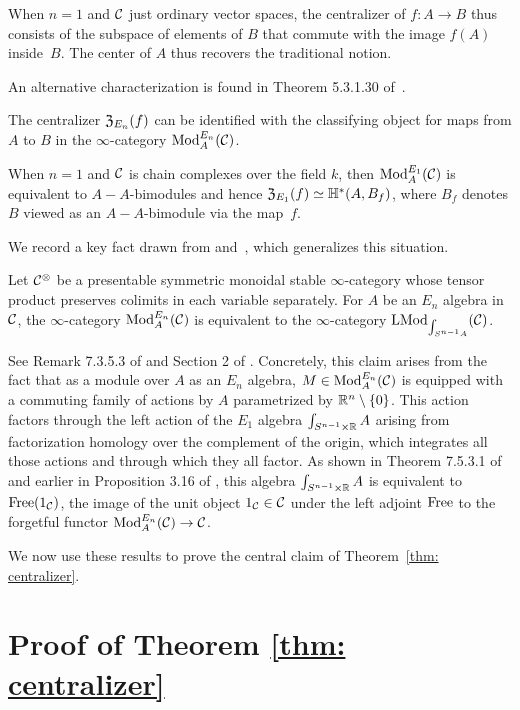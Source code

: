 \documentclass[11pt]{amsart}
\numberwithin{equation}{section}
\begin{document}
When $n=1$ and $\mathcal C$ just ordinary vector spaces, the centralizer of $f: A \to B$ thus consists of the subspace of elements of $B$ that commute with the image $f(A)$ inside~$B$.
The center of $A$ thus recovers the traditional notion.

An alternative characterization is found in Theorem 5.3.1.30 of~\cite{LurieHA}.

\begin{prp}
The centralizer ${\frak Z}_{E_n}(f)$ can be identified with the classifying object for maps from $A$ to $B$ in the $\infty$-category ${\rm Mod}^{E_n}_A(\mathcal C)$.
\end{prp}

When $n=1$ and $\mathcal C$ is chain complexes over the field $k$, 
then ${\rm Mod}^{E_1}_A(\mathcal C)$ is equivalent to $A-A$-bimodules and hence ${\frak Z}_{E_1}(f) \simeq \mathbb H^*(A,B_f)$,
where $B_f$ denotes $B$ viewed as an $A-A$-bimodule via the map~$f$.

We record a key fact drawn from \cite{LurieHA} and~\cite{FrancisHH}, which generalizes this situation.

\begin{prp}
Let $\mathcal C^\otimes$ be a presentable symmetric monoidal stable $\infty$-category whose tensor product preserves colimits in each variable separately.
For $A$ be an $E_n$ algebra in $\mathcal C$,
the $\infty$-category ${\rm Mod}^{E_n}_A(\mathcal C)$ is equivalent to the $\infty$-category ${\rm LMod}_{\int_{S^{n-1} A}}(\mathcal C)$.
\end{prp}

See Remark 7.3.5.3 of \cite{LurieHA} and Section 2 of \cite{FrancisHH}.
Concretely, this claim arises from the fact that as a module over $A$ as an $E_n$ algebra, 
$M \in {\rm Mod}^{E_n}_A(\mathcal C)$ is equipped with a commuting family of actions by $A$ parametrized by $\mathbb R^n \setminus \{0\}$.
This action factors through the left action of the $E_1$ algebra $\int_{S^{n-1} \times \mathbb R} A$ arising from factorization homology over the complement of the origin,
which integrates all those actions and through which they all factor.
As shown in Theorem 7.5.3.1 of \cite{LurieHA} and earlier in Proposition 3.16 of \cite{FrancisHH}, 
this algebra $\int_{S^{n-1} \times \mathbb R} A$ is equivalent to ${\rm Free}(1_\mathcal C)$, 
the image of the unit object $1_\mathcal C \in \mathcal C$ under the left adjoint ${\rm Free}$ to the forgetful functor ${\rm Mod}^{E_n}_A(\mathcal C) \to \mathcal C$.

We now use these results to prove the central claim of Theorem~\ref{thm: centralizer}.

\section{Proof of Theorem \ref{thm: centralizer}}
\end{document}
